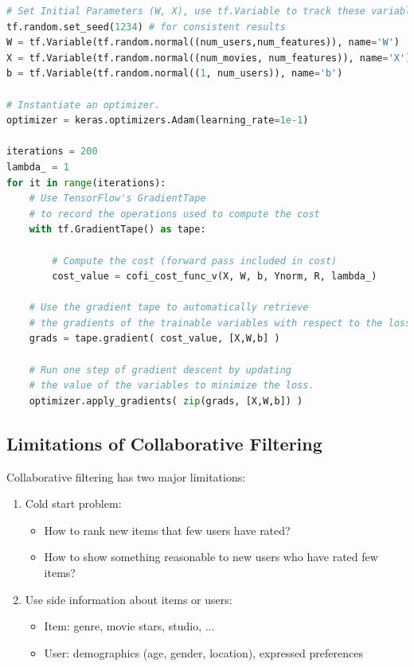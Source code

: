 \documentclass[a4paper, 12pt]{book}
\begin{document}
\begin{lstlisting}[language=Python]
# Set Initial Parameters (W, X), use tf.Variable to track these variables
tf.random.set_seed(1234) # for consistent results
W = tf.Variable(tf.random.normal((num_users,num_features)), name='W')
X = tf.Variable(tf.random.normal((num_movies, num_features)), name='X')
b = tf.Variable(tf.random.normal((1, num_users)), name='b')

# Instantiate an optimizer.
optimizer = keras.optimizers.Adam(learning_rate=1e-1)

iterations = 200
lambda_ = 1
for it in range(iterations):
    # Use TensorFlow's GradientTape
    # to record the operations used to compute the cost 
    with tf.GradientTape() as tape:

        # Compute the cost (forward pass included in cost)
        cost_value = cofi_cost_func_v(X, W, b, Ynorm, R, lambda_)

    # Use the gradient tape to automatically retrieve
    # the gradients of the trainable variables with respect to the loss
    grads = tape.gradient( cost_value, [X,W,b] )

    # Run one step of gradient descent by updating
    # the value of the variables to minimize the loss.
    optimizer.apply_gradients( zip(grads, [X,W,b]) )
\end{lstlisting}

\subsection{Limitations of Collaborative Filtering}

Collaborative filtering has two major limitations:

\begin{enumerate}
    \item Cold start problem:
        \begin{itemize}
            \item How to rank new items that few users have rated?
            \item How to show something reasonable to new users who have rated few items?
        \end{itemize}
    \item Use side information about items or users:
        \begin{itemize}
            \item Item: genre, movie stars, studio, ...
            \item User: demographics (age, gender, location), expressed preferences
        \end{itemize}
\end{enumerate}
\end{document}

